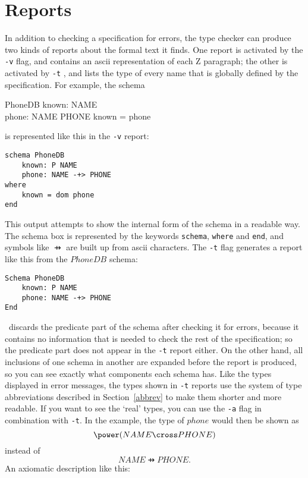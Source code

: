 \section{Reports}\label{reports}

In addition to checking a specification for errors,
the type checker can produce two kinds of reports about the formal
text it finds.  One report is activated by the \verb/-v/
flag, and contains an {\sc ascii} representation of
each Z paragraph; the other is activated by \verb/-t/%
, and lists the type of every name that is globally
defined by 
the specification.  For example, the schema 
\begin{schema}{PhoneDB}
    known: \power NAME \\
    phone: NAME \pfun PHONE
\where
    known = \dom phone
\end{schema}
is represented like this in the \verb/-v/ report:
\begin{verbatim}
schema PhoneDB
    known: P NAME
    phone: NAME -+> PHONE
where
    known = dom phone
end
\end{verbatim}
This output attempts to show the internal form of the
schema in a readable way.  The schema box is represented by the
keywords \verb/schema/, \verb/where/ and \verb/end/, and 
symbols like $\pfun$ are built up from {\sc ascii} characters.
The \verb/-t/ flag generates a report like this from the $PhoneDB$
schema:
\begin{verbatim}
Schema PhoneDB
    known: P NAME
    phone: NAME -+> PHONE
End
\end{verbatim}
\Fuzz\ discards the predicate part of the schema after checking it
for errors, because it contains no information that is needed to
check the rest of the specification; so the predicate part does not
appear in the \verb/-t/ report either.  On the other hand, all
inclusions of one schema in another are expanded before the report
is produced, so you can see exactly what components each schema has.
Like the types displayed in error messages, the types shown in
\verb/-t/ reports use the system of type abbreviations described in
Section~\ref{abbrev} to make them shorter and more readable.  If you
want to see the `real' types, you can use the \verb/-a/ flag in
combination with \verb/-t/.  In the example, the type of $phone$
would then be shown as
\[ \power(NAME \cross PHONE) \]
instead of 
\[ NAME \pfun PHONE. \]
An axiomatic description like this:
